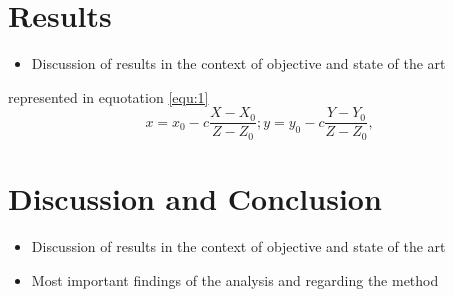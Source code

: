 \documentclass{isprs} %
\begin{document}
\section{Results}\label{Results}


\begin{itemize}
\setlength\itemsep{0em}\setlength\parskip{0em}\setlength\topsep{0em}\setlength\partopsep{0em}\setlength\parsep{0em} 
\item{Discussion of results in the context of objective and state of the art} 
\end{itemize}



represented in equotation \ref{equ:1}
\begin{equation}\label{equ:1}
	x = x_0 -c \frac{X - X_0}{Z - Z_0}; y = y_0 -c \frac{Y - Y_0}{Z - Z_0},
\end{equation}




\section{Discussion and Conclusion}\label{Discussion and Conclusion}

\begin{itemize}
\setlength\itemsep{0em}\setlength\parskip{0em}\setlength\topsep{0em}\setlength\partopsep{0em}\setlength\parsep{0em} 
\item{Discussion of results in the context of objective and state of the art} 

\item{Most important findings of the analysis and regarding the method}
\end{itemize}




{
	\begin{spacing}{1.17}
		\normalsize
		
	\end{spacing}
}
\end{document}
